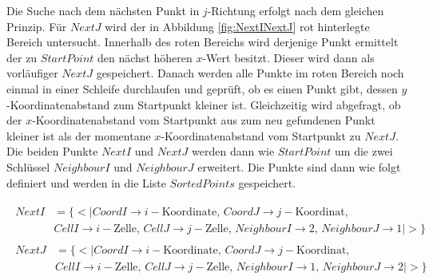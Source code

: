 %


Die Suche nach dem nächsten Punkt in $j$-Richtung erfolgt nach dem gleichen Prinzip. Für $NextJ$ wird der in Abbildung \ref{fig:NextINextJ} rot hinterlegte Bereich untersucht. Innerhalb des roten Bereichs wird derjenige Punkt ermittelt der zu $StartPoint$ den nächst höheren $x$-Wert besitzt. Dieser wird dann als vorläufiger $NextJ$ gespeichert. Danach werden alle Punkte im roten Bereich noch einmal in einer Schleife durchlaufen und geprüft, ob es einen Punkt gibt, dessen $y$-Koordinatenabstand zum Startpunkt kleiner ist. Gleichzeitig wird abgefragt, ob der $x$-Koordinatenabstand vom Startpunkt aus zum neu gefundenen Punkt kleiner ist als der momentane $x$-Koordinatenabstand vom Startpunkt zu $NextJ$. Die beiden Punkte $NextI$ und $NextJ$ werden dann wie $StartPoint$ um die zwei Schlüssel $NeighbourI$ und $NeighbourJ$ erweitert. Die Punkte sind dann wie folgt definiert und werden in die Liste $SortedPoints$ gespeichert. 


\begin{gather*}
	\begin{split}
		NextI &= \{ <|CoordI \rightarrow i-\text{Koordinate},\, CoordJ \rightarrow j-\text{Koordinat},\, \\
		&CellI \rightarrow i-\text{Zelle},\, CellJ \rightarrow j-\text{Zelle},\,
		NeighbourI \rightarrow 2, \,NeighbourJ \rightarrow 1  |>\}
	\end{split}\\
	\begin{split}
	NextJ &= \{ <|CoordI \rightarrow i-\text{Koordinate},\, CoordJ \rightarrow j-\text{Koordinat},\, \\
	&CellI \rightarrow i-\text{Zelle},\, CellJ \rightarrow j-\text{Zelle},\,
	NeighbourI \rightarrow 1, \,NeighbourJ \rightarrow 2 |>\}
\end{split}
\end{gather*}




